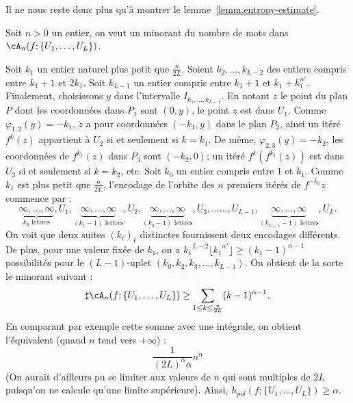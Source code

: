 
Il ne nous reste donc plus qu'à montrer le lemme~\ref{lemm.entropy-estimate}.

\begin{proofc}

\begin{step}
Soit $n>0$ un entier, on veut un minorant du nombre de mots dans $\cA_n (f; \{U_1, \dots, U_L\})$.

Soit $k_1$ un entier naturel plus petit que $\frac{n}{2L}$. Soient $k_2, \dots, k_{L-2}$ des entiers compris entre $k_1+1$ et $2k_1$. Soit $k_{L-1}$ un entier compris entre $k_1+1$ et $k_1+k_1^{\alpha'}$. Finalement, choisissons $y$ dans l'intervalle $I_{k_1,\dots, k_{L-1}}$. En notant $z$ le point du plan $P$ dont les coordonnées dans $P_1$ sont $(0,y)$, le point $z$ est dans $U_1$. Comme $\varphi_{1,2}(y)=-k_1$, $z$ a pour coordonnées $(-k_1, y)$ dans le plan $P_2$, ainsi un itéré $f^{k}(z)$ appartient à $U_2$ si et seulement si $k=k_1$. De même, $\varphi_{2,3}(y)=-k_2$, les coordonnées de $f^{k_1}(z)$ dans $P_3$ sont $(-k_2,0)$; un itéré $f^{k}(f^{k_1}(z))$ est dans $U_3$ si et seulement si $k=k_2$, etc. Soit $k_0$ un entier compris entre $1$ et $k_1$. Comme $k_1$ est plus petit que $\frac{n}{2L}$, l'encodage de l'orbite des $n$ premiers itérés de $f^{-k_0}z$ commence par :
\[
\underbrace{\infty, \dots,\infty}_{k_0 \text{ lettres}}, U_1,
\underbrace{\infty, \dots,\infty}_{(k_1 -1) \text{ lettres}}, U_2,
\underbrace{\infty, \dots,\infty}_{(k_2 -1) \text{ lettres}}, U_3, \dots \dots, U_{L-1},
\underbrace{\infty, \dots, \infty}_{(k_{L-1} -1) \text{ lettres}},U_L.
\]
On voit que deux suites $(k_\ell)_\ell$ distinctes fournissent deux encodages différents. De plus, pour une valeur fixée de $k_1$, on a ${k_1}^{L-2}\lfloor{k_1}^{\alpha'}\rfloor \geq (k_1-1)^{\alpha-1}$ possibilités pour le $(L-1)$-uplet $(k_0, k_2, k_3, \dots, k_{L-1})$. On obtient de la sorte le minorant suivant :
\[
\sharp \cA_n (f; \{U_1, \dots, U_L\}) \geq
\sum_{1 \leq k \leq \frac{n}{2L}} (k-1)^{\alpha-1}.
\]
En comparant par exemple cette somme avec une intégrale, on obtient l'équivalent (quand $n$ tend vers $+\infty$) :
\[
\frac{1}{(2L)^\alpha \alpha} n^\alpha
\]
(On aurait d'ailleurs pu se limiter aux valeurs de $n$ qui sont multiples de $2L$ puisqu'on ne calcule qu'une limite supérieure). Ainsi, $h_{pol}(f; \{U_1, \dots, U_L\}) \geq \alpha$.
\end{step}


\end{proofc}
